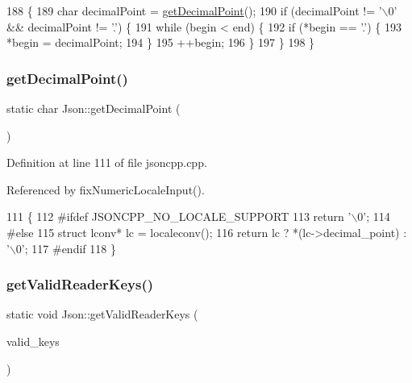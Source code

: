 \begin{DoxyCode}
188                                                                  \{
189   \textcolor{keywordtype}{char} decimalPoint = \hyperlink{namespace_json_ac99d7a5551039dfa712dd1d143c25a16}{getDecimalPoint}();
190   \textcolor{keywordflow}{if} (decimalPoint != \textcolor{charliteral}{'\(\backslash\)0'} && decimalPoint != \textcolor{charliteral}{'.'}) \{
191     \textcolor{keywordflow}{while} (begin < end) \{
192       \textcolor{keywordflow}{if} (*begin == \textcolor{charliteral}{'.'}) \{
193         *begin = decimalPoint;
194       \}
195       ++begin;
196     \}
197   \}
198 \}
\end{DoxyCode}
\mbox{\label{namespace_json_ac99d7a5551039dfa712dd1d143c25a16}} 
\subsubsection{\texorpdfstring{get\+Decimal\+Point()}{getDecimalPoint()}}
{\footnotesize\ttfamily static char Json\+::get\+Decimal\+Point (\begin{DoxyParamCaption}{ }\end{DoxyParamCaption})\hspace{0.3cm}{\ttfamily [static]}}



Definition at line 111 of file jsoncpp.\+cpp.



Referenced by fix\+Numeric\+Locale\+Input().


\begin{DoxyCode}
111                               \{
112 \textcolor{preprocessor}{#ifdef JSONCPP\_NO\_LOCALE\_SUPPORT}
113   \textcolor{keywordflow}{return} \textcolor{charliteral}{'\(\backslash\)0'};
114 \textcolor{preprocessor}{#else}
115   \textcolor{keyword}{struct }lconv* lc = localeconv();
116   \textcolor{keywordflow}{return} lc ? *(lc->decimal\_point) : \textcolor{charliteral}{'\(\backslash\)0'};
117 \textcolor{preprocessor}{#endif}
118 \}
\end{DoxyCode}
\mbox{\label{namespace_json_a8c38450840f3d88e9b981ae132f7ad0a}} 
\subsubsection{\texorpdfstring{get\+Valid\+Reader\+Keys()}{getValidReaderKeys()}}
{\footnotesize\ttfamily static void Json\+::get\+Valid\+Reader\+Keys (\begin{DoxyParamCaption}\item[{std\+::set$<$ \hyperlink{json_8h_a1e723f95759de062585bc4a8fd3fa4be}{J\+S\+O\+N\+C\+P\+P\+\_\+\+S\+T\+R\+I\+NG} $>$ $\ast$}]{valid\+\_\+keys }\end{DoxyParamCaption})\hspace{0.3cm}{\ttfamily [static]}}




